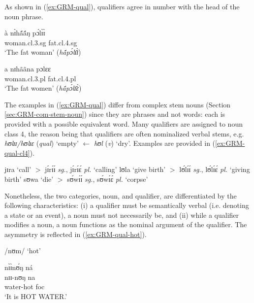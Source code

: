 \begin{exe}
\begin{exe}
\begin{exe}
{\begin{exe}
\begin{exe}
\begin{exe}
\begin{exe}
\begin{exe}
\begin{exe}
\begin{exe}
\begin{xlist}
\begin{exe}
  
\z 
 \z


As shown in (\ref{ex:GRM-qual}), qualifiers agree in number with the head of the
noun phrase. 

\ea\label{ex:GRM-qual-agree}
 
  \ea\label{ex:GRM-qual-agree-sg}

\gll à  nɪ̀hã́ã́ŋ pɔ́lɪ̀ɪ̀\\
{\art} woman.{\sc cl.3.sg} fat.{\sc cl.4.sg}   \\
\glt `The fat woman' ({\it hã́pɔ́lɪ̄ɪ̀})


  \ex\label{ex:GRM-qual-agree-pl}

\gll a nɪhããna pɔlɛɛ\\
{\art} woman.{\sc cl.3.pl} fat.{\sc cl.4.pl}   \\
\glt `The fat women' ({\it hã́pɔ́lɪ̄ɛ̀})

  
\z 
 \z

The examples in (\ref{ex:GRM-qual}) differ from complex stem nouns (Section 
\ref{sec:GRM-com-stem-noun}) since they are phrases and not words: each is 
provided with a possible equivalent word.
Many qualifiers are assigned to noun class 4, the
reason being that qualifiers are often nominalized verbal stems, e.g. {\it 
hʊlɪɪ/hʊlɪɛ} ({\it qual}) `empty' $\leftarrow$ {\it hʊl}  ({\it v})  `dry'.  
Examples are
provided in  (\ref{ex:GRM-qual-cl4}).


\ea\label{ex:GRM-qual-cl4}
 
  \ea\label{ex:GRM-qual-cl4-call}
jɪra `call' $>$ jɪ́rɪ́ɪ́  {\it sg.},  jɪ́rɪ́ɛ́  {\it pl.} `calling'
\ex\label{ex:GRM-qual-cl4-give-birth}
lʊla `give birth' $>$ lʊ́lɪ́ɪ́ {\it sg.},   lʊ́lɪ́ɛ́ {\it pl.} `giving birth'
\ex\label{ex:GRM-qual-cl4-die}
sʊwa `die' $>$ sʊ́wɪ́ɪ́ {\it sg.},  sʊ́wɪ́ɛ́ {\it pl.} `corpse'

  
\z 
 \z



Nonetheless, the two categories, noun, and qualifier, are differentiated by the
following characteristics: (i)  a qualifier must be semantically verbal (i.e. 
denoting a state or an event),
a noun must not necessarily be, and (ii) while a qualifier
modifies a noun,  a  noun functions as  the
nominal argument of the qualifier. The asymmetry is reflected in
(\ref{ex:GRM-qual-hot}).

\ea\label{ex:GRM-qual-hot}{\rm  /nʊm/ `hot'}
 
  \ea\label{ex:GRM-qual-hot-cmp-stem}
  \glll nɪ̀ɪ̀nʊ́ŋ ná \\
 nɪɪ-nʊŋ na \\
     water-hot {\sc foc}\\
  \glt `It is HOT WATER.'


\end{exe}
\end{xlist}
\end{exe}
\end{exe}
\end{exe}
\end{exe}
\end{exe}
\end{exe}
\end{exe}}
\end{exe}
\end{exe}
\end{exe}
